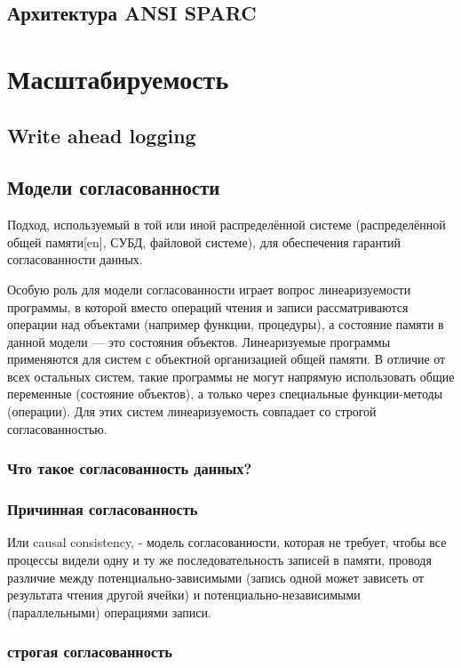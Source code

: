 \section{Архитектура ANSI SPARC}

\chapter{Масштабируемость}

\section{Write ahead logging}

\section{Модели согласованности}
Подход, используемый в той или иной распределённой системе (распределённой общей памяти[en], СУБД, файловой системе), для обеспечения гарантий согласованности данных. 

Особую роль для модели согласованности играет вопрос линеаризуемости программы, в которой вместо операций чтения и записи рассматриваются операции над объектами (например функции, процедуры), а состояние памяти в данной модели — это состояния объектов. Линеаризуемые программы применяются для систем с объектной организацией общей памяти. В отличие от всех остальных систем, такие программы не могут напрямую использовать общие переменные (состояние объектов), а только через специальные функции-методы (операции). Для этих систем линеаризуемость совпадает со строгой согласованностью. 

\subsection{Что такое согласованность данных?}

\subsection{Причинная согласованность}
Или causal consistency, - модель согласованности, которая не требует, чтобы все процессы видели одну и ту же последовательность записей в памяти, проводя различие между потенциально-зависимыми (запись одной может зависеть от результата чтения другой ячейки) и потенциально-независимыми (параллельными) операциями записи.

\subsection{строгая согласованность}

